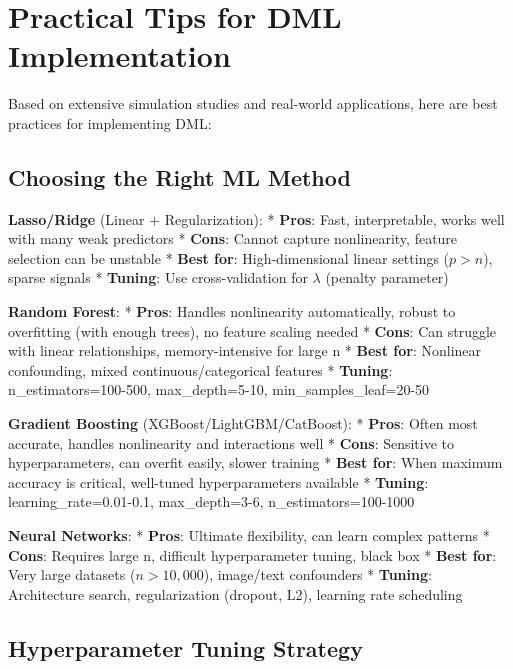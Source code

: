 \section{Practical Tips for DML
Implementation}\label{_practical_tips_for_dml_implementation}

Based on extensive simulation studies and real-world applications, here
are best practices for implementing DML:

\subsection{Choosing the Right ML
Method}\label{_choosing_the_right_ml_method}

\textbf{Lasso/Ridge} (Linear + Regularization): * \textbf{Pros}: Fast,
interpretable, works well with many weak predictors * \textbf{Cons}:
Cannot capture nonlinearity, feature selection can be unstable *
\textbf{Best for}: High-dimensional linear settings ($p > n$), sparse signals * \textbf{Tuning}: Use cross-validation for $\lambda$
(penalty parameter)

\textbf{Random Forest}: * \textbf{Pros}: Handles nonlinearity
automatically, robust to overfitting (with enough trees), no feature
scaling needed * \textbf{Cons}: Can struggle with linear relationships,
memory-intensive for large n * \textbf{Best for}: Nonlinear confounding,
mixed continuous/categorical features * \textbf{Tuning}:
n\_estimators=100-500, max\_depth=5-10, min\_samples\_leaf=20-50

\textbf{Gradient Boosting} (XGBoost/LightGBM/CatBoost): * \textbf{Pros}:
Often most accurate, handles nonlinearity and interactions well *
\textbf{Cons}: Sensitive to hyperparameters, can overfit easily, slower
training * \textbf{Best for}: When maximum accuracy is critical,
well-tuned hyperparameters available * \textbf{Tuning}:
learning\_rate=0.01-0.1, max\_depth=3-6, n\_estimators=100-1000

\textbf{Neural Networks}: * \textbf{Pros}: Ultimate flexibility, can
learn complex patterns * \textbf{Cons}: Requires large n, difficult
hyperparameter tuning, black box * \textbf{Best for}: Very large
datasets ($n > 10{,}000$), image/text confounders *
\textbf{Tuning}: Architecture search, regularization (dropout, L2),
learning rate scheduling

\subsection{Hyperparameter Tuning
Strategy}\label{_hyperparameter_tuning_strategy}

